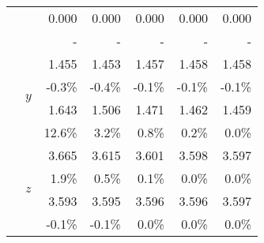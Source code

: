 {{{\begin{tabularx}{0.75\textwidth}{@{} XX rrrrr@{}}
					&&{\color{black}\normalsize0.000}&{\color{black}\normalsize0.000}&{\color{black}\normalsize0.000}&{\color{black}\normalsize0.000}&{\color{black}\normalsize0.000}\\
					&&{\color{black}\scriptsize-}&{\color{black}\scriptsize-}&{\color{black}\scriptsize-}&{\color{black}\scriptsize-}&{\color{black}\scriptsize-}\\\cmidrule[0.5\cmidrulewidth]{2-7}
					&\multirow{4}{*}{$y$}&{\color{Tblue}\normalsize1.455}&{\color{Tblue}\normalsize1.453}&{\color{Tblue}\normalsize1.457}&{\color{Tblue}\normalsize1.458}&{\color{Tblue}\normalsize1.458}\\
					&&{\color{Tblue}\scriptsize-0.3\%}&{\color{Tblue}\scriptsize-0.4\%}&{\color{Tblue}\scriptsize-0.1\%}&{\color{Tblue}\scriptsize-0.1\%}&{\color{Tblue}\scriptsize-0.1\%}\\
					&&{\color{black}\normalsize1.643}&{\color{black}\normalsize1.506}&{\color{black}\normalsize1.471}&{\color{black}\normalsize1.462}&{\color{black}\normalsize1.459}\\
					&&{\color{black}\scriptsize12.6\%}&{\color{black}\scriptsize3.2\%}&{\color{black}\scriptsize0.8\%}&{\color{black}\scriptsize0.2\%}&{\color{black}\scriptsize0.0\%}\\\cmidrule[0.5\cmidrulewidth]{2-7}
					&\multirow{4}{*}{$z$}&{\color{Tblue}\normalsize3.665}&{\color{Tblue}\normalsize3.615}&{\color{Tblue}\normalsize3.601}&{\color{Tblue}\normalsize3.598}&{\color{Tblue}\normalsize3.597}\\
					&&{\color{Tblue}\scriptsize1.9\%}&{\color{Tblue}\scriptsize0.5\%}&{\color{Tblue}\scriptsize0.1\%}&{\color{Tblue}\scriptsize0.0\%}&{\color{Tblue}\scriptsize0.0\%}\\
					&&{\color{black}\normalsize3.593}&{\color{black}\normalsize3.595}&{\color{black}\normalsize3.596}&{\color{black}\normalsize3.596}&{\color{black}\normalsize3.597}\\
					&&{\color{black}\scriptsize-0.1\%}&{\color{black}\scriptsize-0.1\%}&{\color{black}\scriptsize0.0\%}&{\color{black}\scriptsize0.0\%}&{\color{black}\scriptsize0.0\%}\\
					\bottomrule
				\end{tabularx}}
	}
}

